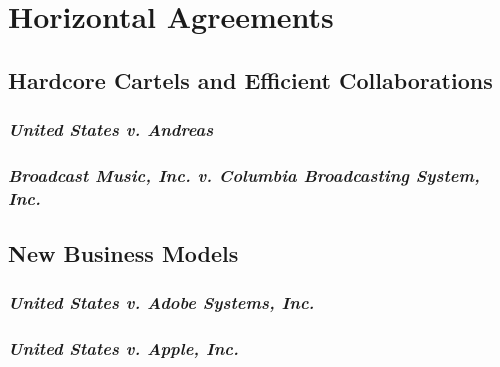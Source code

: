 \section{Horizontal Agreements}

\subsection{Hardcore Cartels and Efficient Collaborations}

\subsubsection{\emph{United States v. Andreas}}


\subsubsection{\emph{Broadcast Music, Inc. v. Columbia Broadcasting System, Inc.}}


\subsection{New Business Models}

\subsubsection{\emph{United States v. Adobe Systems, Inc.}}


\newpage %
\subsubsection{\emph{United States v. Apple, Inc.}}

